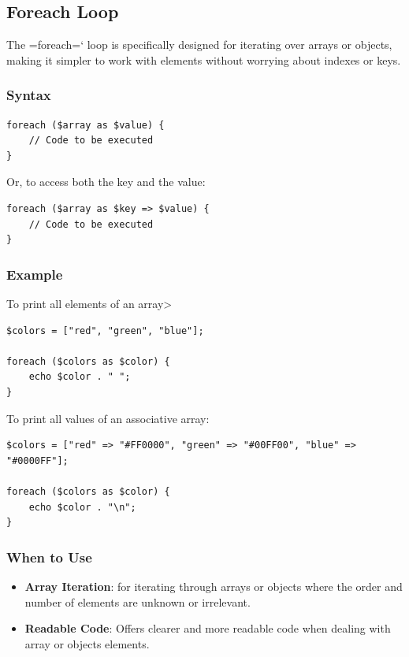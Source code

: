 \documentclass[11pt]{article}
\begin{document}
\subsection{Foreach Loop}
\label{sec:orgc46f589}
The =foreach=` loop is specifically designed for iterating over arrays
or objects, making it simpler to work with elements without worrying
about indexes or keys.

\subsubsection{Syntax}
\label{sec:org952f03f}
\begin{verbatim}
foreach ($array as $value) {
    // Code to be executed
}
\end{verbatim}

Or, to access both the key and the value:

\begin{verbatim}
foreach ($array as $key => $value) {
    // Code to be executed
}
\end{verbatim}

\subsubsection{Example}
\label{sec:org1e4a04e}
To print all elements of an array>
\begin{verbatim}
$colors = ["red", "green", "blue"];

foreach ($colors as $color) {
    echo $color . " ";
}
\end{verbatim}


To print all values of an associative array:

\begin{verbatim}
$colors = ["red" => "#FF0000", "green" => "#00FF00", "blue" => "#0000FF"];

foreach ($colors as $color) {
    echo $color . "\n";
}
\end{verbatim}

\subsubsection{When to Use}
\label{sec:org8db14a5}
\begin{itemize}
\item \textbf{Array Iteration}: for iterating through arrays or objects where the
order and number of elements are unknown or irrelevant.
\item \textbf{Readable Code}: Offers clearer and more readable code when dealing
with array or objects elements.
\end{itemize}
\end{document}
